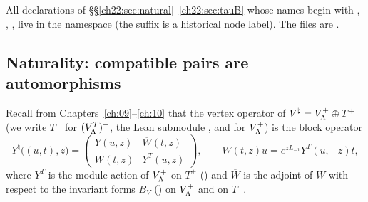 All declarations of \S\S\ref{ch22:sec:natural}--\ref{ch22:sec:tauB} whose names begin with , ,
,  live in the namespace  (the suffix  is a historical node label).  The files are
.

\subsection{Naturality: compatible pairs are automorphisms}

Recall from Chapters~\ref{ch:09}--\ref{ch:10} that the vertex operator of ${V^{\natural}}=V_{\Lambda}^+\oplus T^+$ (we write
$T^+$ for $(V_{\Lambda}^T)^+$, the Lean submodule , and  for $V_{\Lambda}^+$) is the block operator
\begin{equation}\label{ch22:eq:block}
  Y^\natural\bigl((u,t),z\bigr)=\begin{pmatrix}Y(u,z)&\overline W(t,z)\\ W(t,z)&Y^T(u,z)\end{pmatrix},
  \qquad W(t,z)u=e^{zL_{-1}}Y^T(u,-z)t,
\end{equation}
where $Y^T$ is the module action of $V_{\Lambda}^+$ on $T^+$ () and $\overline W$ is the adjoint of
$W$ with respect to the invariant forms $B_V$ () on $V_{\Lambda}^+$ and  on $T^+$.

